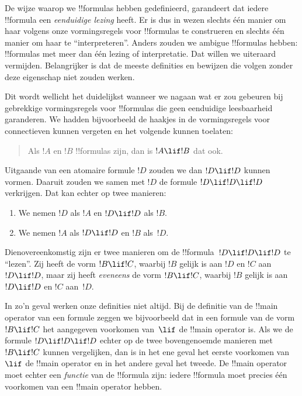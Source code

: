 \documentclass[../../../include/open-logic-section]{subfiles}
\begin{document}


\begin{explain}
De wijze waarop we !!{formula}s hebben gedefinieerd, garandeert dat
iedere !!{formula} een \emph{eenduidige lezing} heeft. Er is dus in
wezen slechts één manier om haar volgens onze vormingsregels voor
!!{formula}s te construeren en slechts één manier om haar te
``interpreteren''. Anders zouden we ambigue !!{formula}s hebben:
!!{formula}s met meer dan één lezing of interpretatie. Dat willen we
uiteraard vermijden. Belangrijker is dat de meeste definities en
bewijzen die volgen zonder deze eigenschap niet zouden werken.

Dit wordt wellicht het duidelijkst wanneer we nagaan wat er zou
gebeuren bij gebrekkige vormingsregels voor !!{formula}s die geen
eenduidige leesbaarheid garanderen. We hadden bijvoorbeeld de haakjes
in de vormingsregels voor connectieven kunnen vergeten en het volgende
kunnen toelaten:
\begin{quote}
Als $!A$ en $!B$ !!{formula}s zijn, dan is $!A \lif !B$ dat ook.
\end{quote}
Uitgaande van een atomaire formule $!D$ zouden we dan $!D \lif !D$
kunnen vormen. Daaruit zouden we samen met $!D$ de formule $!D \lif !D
\lif !D$ verkrijgen. Dat kan echter op twee manieren:
\begin{enumerate}
\item We nemen $!D$ als $!A$ en $!D \lif !D$ als $!B$.
\item We nemen $!A$ als $!D \lif !D$ en $!B$ als~$!D$.  
\end{enumerate}
Dienovereenkomstig zijn er twee manieren om de !!{formula}~$!D \lif !D
\lif !D$ te ``lezen''. Zij heeft de vorm $!B \lif !C$, waarbij $!B$
gelijk is aan $!D$ en $!C$ aan $!D \lif !D$, maar zij heeft
\emph{eveneens} de vorm $!B \lif !C$, waarbij $!B$ gelijk is aan $!D
\lif !D$ en $!C$ aan~$!D$.

In zo'n geval werken onze definities niet altijd. Bij de definitie van
de !!{main operator} van een formule zeggen we bijvoorbeeld dat in een
formule van de vorm $!B \lif !C$ het aangegeven voorkomen van~$\lif$
de !!{main operator} is. Als we de formule $!D \lif !D \lif !D$ echter
op de twee bovengenoemde manieren met $!B \lif !C$ kunnen vergelijken,
dan is in het ene geval het eerste voorkomen van $\lif$ de !!{main
operator} en in het andere geval het tweede. De !!{main operator} moet
echter een \emph{functie} van de !!{formula} zijn: iedere !!{formula}
moet precies één voorkomen van een !!{main operator} hebben.
\end{explain}
\end{document}
